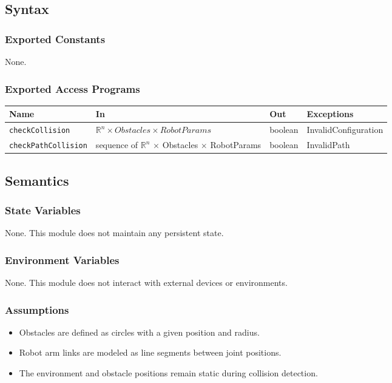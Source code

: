 \documentclass[12pt, titlepage]{article}
\begin{document}
\subsection{Syntax}

\subsubsection{Exported Constants}
None.

\subsubsection{Exported Access Programs}

\begin{center}
  \renewcommand{\arraystretch}{1.4}
  \begin{tabular}{p{4cm} p{4cm} p{3cm} p{4cm}}
    \toprule
    \textbf{Name} & \textbf{In} & \textbf{Out} & \textbf{Exceptions} \\
    \midrule
    \texttt{checkCollision} & $\mathbb{R}^n \times Obstacles \times RobotParams$ & boolean & InvalidConfiguration \\[4pt]
    \texttt{checkPathCollision} & sequence of $\mathbb{R}^n$ $\times$ Obstacles $\times$ RobotParams & boolean & InvalidPath \\[4pt]
    \bottomrule
  \end{tabular}
\end{center}

\subsection{Semantics}

\subsubsection{State Variables}
None. This module does not maintain any persistent state.

\subsubsection{Environment Variables}
None. This module does not interact with external devices or environments.

\subsubsection{Assumptions}

\begin{itemize}
  \item Obstacles are defined as circles with a given position and radius.
  \item Robot arm links are modeled as line segments between joint positions.
  \item The environment and obstacle positions remain static during collision detection.
\end{itemize}
\end{document}
